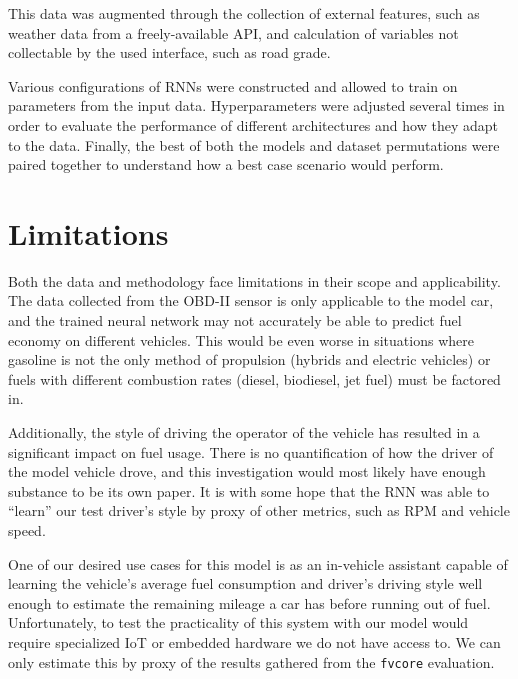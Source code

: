 \documentclass[letterpaper]{article}
\begin{document}
This data was augmented through the collection of external features, 
such as weather data from a freely-available API, and calculation of 
variables not collectable by the used interface, such as road grade.

Various configurations of RNNs were constructed and allowed to train on 
parameters from the input data. Hyperparameters were adjusted several 
times in order to evaluate the performance of different architectures 
and how they adapt to the data. Finally, the best of both the models and 
dataset permutations were paired together to understand how a best case 
scenario would perform.

\section{Limitations}
Both the data and methodology face limitations in their scope and 
applicability. The data collected from the OBD-II sensor is only 
applicable to the model car, and the trained neural network may not 
accurately be able to predict fuel economy on different vehicles. This 
would be even worse in situations where gasoline is not the only method 
of propulsion (hybrids and electric vehicles) or fuels with different
combustion rates (diesel, biodiesel, jet fuel) must be factored in.

Additionally, the style of driving the operator of the vehicle has 
resulted in a significant impact on fuel usage. There is no 
quantification of how the driver of the model vehicle drove, and this 
investigation would most likely have enough substance to be its own paper. 
It is with some hope that the RNN was able to ``learn'' our test driver's 
style by proxy of other metrics, such as RPM and vehicle speed.

One of our desired use cases for this model is as an in-vehicle assistant 
capable of learning the vehicle's average fuel consumption and driver's 
driving style well enough to estimate the remaining mileage a car has 
before running out of fuel. Unfortunately, to test the practicality of 
this system with our model would require specialized IoT or embedded 
hardware we do not have access to. We can only estimate this by proxy of 
the results gathered from the \verb|fvcore| evaluation.

 

\end{document}
